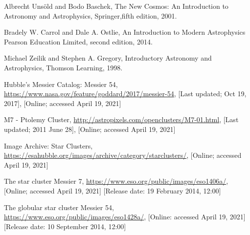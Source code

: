 \documentclass[12pt, twocolumn]{aastex62}
\begin{document}
\pagebreak
\begin{thebibliography}{}
	
{Albrecht Uns\"{o}ld and Bodo Baschek},
{The New Cosmos: An Introduction to Astronomy and Astrophysics},
{Springer},{fifth edition}, 2001.

{Bradely W. Carrol and Dale A. Ostlie},
{An Introduction to Modern Astrophysics}
{Pearson Education Limited},
{second edition}, 2014.

{Michael Zeilik and Stephen A. Gregory},
{Introductory Astronomy and Astrophysics},
{Thomson Learning}, 1998.

{Hubble's Messier Catalog: Messier 54},
{\url{https://www.nasa.gov/feature/goddard/2017/messier-54}},
{[Last updated; Oct 19, 2017]},
{[Online; accessed April 19, 2021]}

{M7 - Ptolemy Cluster},
{\url{http://astropixels.com/openclusters/M7-01.html}},
{[Last updated; 2011 June 28]},
{[Online; accessed April 19, 2021]}

{Image Archive: Star Clusters},
{\url{https://esahubble.org/images/archive/category/starclusters/}},
{[Online; accessed April 19, 2021]}

{The star cluster Messier 7},
{\url{https://www.eso.org/public/images/eso1406a/}},
{[Online; accessed April 19, 2021]}
{[Release date: 19 February 2014, 12:00]}

{The globular star cluster Messier 54},
{\url{https://www.eso.org/public/images/eso1428a/}},
{[Online: accessed April 19, 2021]}
{[Release date: 10 September 2014, 12:00]}


\end{thebibliography}


\end{document}
